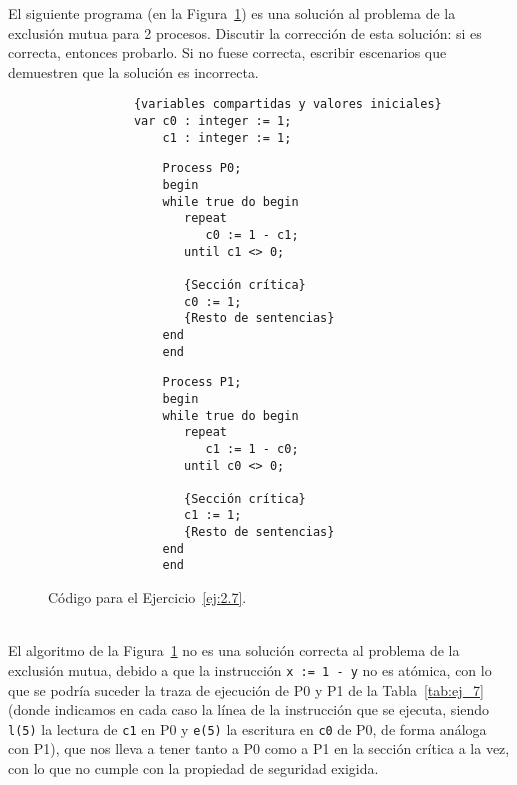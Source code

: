 \begin{ejercicio}\label{ej:2.7}
    El siguiente programa (en la Figura~\ref{fig:cod_7}) es una solución al problema de la exclusión mutua para 2 procesos.  Discutir la corrección de esta solución: si es correcta, entonces probarlo. Si no fuese correcta, escribir escenarios que demuestren que la solución es incorrecta.
    \begin{figure}[H]
        \centering
        \begin{verbatim}
            {variables compartidas y valores iniciales}
            var c0 : integer := 1;
                c1 : integer := 1;
        \end{verbatim}
        \setlength{\columnsep}{1cm}
        \begin{multicols}{2}
            \begin{verbatim}
                Process P0;
                begin
                while true do begin
                   repeat 
                      c0 := 1 - c1;
                   until c1 <> 0;

                   {Sección crítica}
                   c0 := 1;
                   {Resto de sentencias}
                end
                end
            \end{verbatim}
            \begin{verbatim}
                Process P1;
                begin
                while true do begin
                   repeat 
                      c1 := 1 - c0;
                   until c0 <> 0;

                   {Sección crítica}
                   c1 := 1;
                   {Resto de sentencias}
                end
                end
            \end{verbatim}
        \end{multicols}
        \caption{Código para el Ejercicio~\ref{ej:2.7}.}
        \label{fig:cod_7}
    \end{figure}

    \ \\

    El algoritmo de la Figura~\ref{fig:cod_7} no es una solución correcta al problema de la exclusión mutua, debido a que la instrucción \verb|x := 1 - y| no es atómica, con lo que se podría suceder la traza de ejecución de P0 y P1 de la Tabla~\ref{tab:ej_7} (donde indicamos en cada caso la línea de la instrucción que se ejecuta, siendo \verb|l(5)| la lectura de \verb|c1| en P0 y \verb|e(5)| la escritura en \verb|c0| de P0, de forma análoga con P1), que nos lleva a tener tanto a P0 como a P1 en la sección crítica a la vez, con lo que no cumple con la propiedad de seguridad exigida. 


\end{ejercicio}

